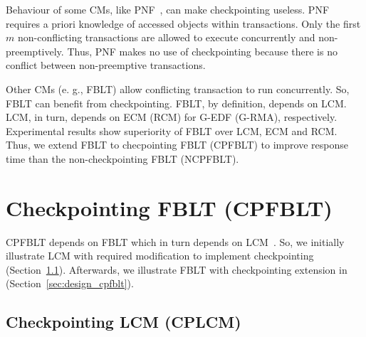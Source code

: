 \documentclass[preprint]{sigplanconf}
\begin{document}
Behaviour of some CMs, like PNF~\cite{pnf_dac_asp}, can make checkpointing useless. PNF requires a priori knowledge of accessed objects within transactions. Only the first $m$ non-conflicting transactions are allowed to execute concurrently and non-preemptively. Thus, PNF makes no use of checkpointing because there is no conflict between non-preemptive transactions.

Other CMs (e. g., FBLT\cite{fblt}) allow conflicting transaction to run concurrently. So, FBLT can benefit from checkpointing. FBLT, by definition, depends on LCM. LCM, in turn, depends
on ECM (RCM) for G-EDF (G-RMA), respectively. Experimental results
show superiority of FBLT over LCM, ECM and RCM\cite{fblt}. Thus, we extend FBLT to checpointing FBLT (CPFBLT) to improve response time than the non-checkpointing FBLT (NCPFBLT).

\section{Checkpointing FBLT (CPFBLT)}\label{sec:cpfblt_design}

CPFBLT depends on FBLT which in turn depends on LCM~\cite{lcmdac2012}. So, we initially illustrate LCM with required modification to implement checkpointing (Section~\ref{sec:cplcm}). Afterwards, we illustrate FBLT with checkpointing extension in (Section~\ref{sec:design_cpfblt}).

\subsection{Checkpointing LCM (CPLCM)}\label{sec:cplcm}
\end{document}
